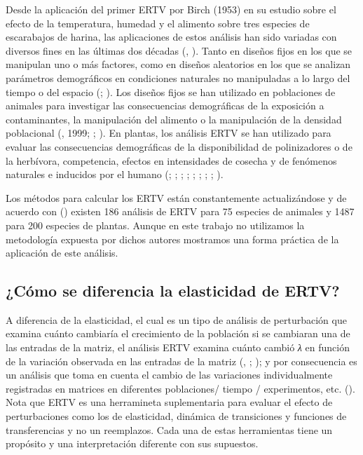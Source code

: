 \documentclass[
]{book}
\theoremstyle{definition}
\theoremstyle{definition}
\theoremstyle{definition}
\theoremstyle{definition}
\theoremstyle{remark}
\begin{document}
Desde la aplicación del primer ERTV por Birch (1953) en su estudio sobre el efecto de la temperatura, humedad y el alimento sobre tres especies de escarabajos de harina, las aplicaciones de estos análisis han sido variadas con diversos fines en las últimas dos décadas (\citet{caswell1989analysis}, \citet{caswell2010life}). Tanto en diseños fijos en los que se manipulan uno o más factores, como en diseños aleatorios en los que se analizan parámetros demográficos en condiciones naturales no manipuladas a lo largo del tiempo o del espacio (\citet{horvitz1997relative}; \citet{teitel2016assessing}). Los diseños fijos se han utilizado en poblaciones de animales para investigar las consecuencias demográficas de la exposición a contaminantes, la manipulación del alimento o la manipulación de la densidad poblacional (\citet{hansen1999multiannual}, 1999; \citet{levin1996demographic}; \citet{oli2001effect}). En plantas, los análisis ERTV se han utilizado para evaluar las consecuencias demográficas de la disponibilidad de polinizadores o de la herbívora, competencia, efectos en intensidades de cosecha y de fenómenos naturales e inducidos por el humano (\citet{davison2010demographic}; \citet{gaoue2010effects}; \citet{garcia2002reproductive}; \citet{hart2021simulated}; \citet{jacquemyn2012stochastic}; \citet{miriti2001effects}; \citet{mondragon2009population}; \citet{nordbakken2004demography}; \citet{schmidt2011matrix}).

Los métodos para calcular los ERTV están constantemente actualizándose y de acuerdo con (\citet{hernandez2023exact}) existen 186 análisis de ERTV para 75 especies de animales y 1487 para 200 especies de plantas. Aunque en este trabajo no utilizamos la metodología expuesta por dichos autores mostramos una forma práctica de la aplicación de este análisis.

\subsection{¿Cómo se diferencia la elasticidad de ERTV?}\label{cuxf3mo-se-diferencia-la-elasticidad-de-ertv}

A diferencia de la elasticidad, el cual es un tipo de análisis de perturbación que examina cuánto cambiaría el crecimiento de la población si se cambiaran una de las entradas de la matriz, el análisis ERTV examina cuánto cambió \emph{λ} en función de la variación observada en las entradas de la matriz (\citet{caswell2000matrix}, \citet{caswell2010life}; \citet{horvitz1997relative}); y por consecuencia es un análisis que toma en cuenta el cambio de las variaciones individualmente registradas en matrices en diferentes poblaciones/ tiempo / experimentos, etc. (\citet{caswell2010life}). Nota que ERTV es una herramineta suplementaria para evaluar el efecto de perturbaciones como los de elasticidad, dinámica de transiciones y funciones de transferencias y no un reemplazos. Cada una de estas herramientas tiene un propósito y una interpretación diferente con sus supuestos.
\end{document}
